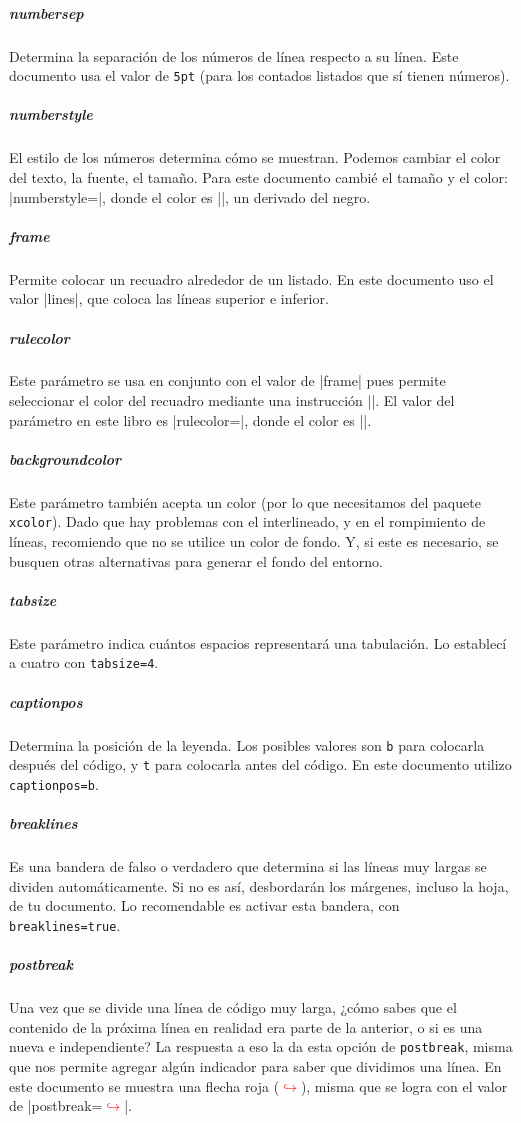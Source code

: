 \subparagraph{numbersep} Determina la separación de los números de línea respecto a su línea. Este documento usa el valor de \texttt{5pt} (para los contados listados que sí tienen números).

\subparagraph{numberstyle} El estilo de los números determina cómo se muestran. Podemos cambiar el color del texto, la fuente, el tamaño. Para este documento cambié el tamaño y el color: |numberstyle=\tiny\color{codigo_numero_linea}|, donde el color es  ||, un derivado del negro.

\subparagraph{frame} Permite colocar un recuadro alrededor de un listado. En este documento uso el valor |lines|, que coloca las líneas superior e inferior.

\subparagraph{rulecolor} Este parámetro se usa en conjunto con el valor de |frame| pues permite seleccionar el color del recuadro mediante una instrucción |\color|. El valor del parámetro en este libro es |rulecolor=\color{codigo_linea_margen}|, donde el color es ||.

\subparagraph{backgroundcolor} Este parámetro también acepta un color (por lo que necesitamos del paquete \texttt{xcolor}). Dado que hay problemas con el interlineado, y en el rompimiento de líneas, recomiendo que no se utilice un color de fondo. Y, si este es necesario, se busquen otras alternativas para generar el fondo del entorno.

\subparagraph{tabsize} Este parámetro indica cuántos espacios representará una tabulación. Lo establecí a cuatro con \texttt{tabsize=4}.

\subparagraph{captionpos} Determina la posición de la leyenda. Los posibles valores son \texttt{b} para colocarla después del código, y \texttt{t} para colocarla antes del código. En este documento utilizo \texttt{captionpos=b}.

\subparagraph{breaklines} Es una bandera de falso o verdadero que determina si las líneas muy largas se dividen automáticamente. Si no es así, desbordarán los márgenes, incluso la hoja, de tu documento. Lo recomendable es activar esta bandera, con \texttt{breaklines=true}.

\subparagraph{postbreak} Una vez que se divide una línea de código muy larga, ¿cómo sabes que el contenido de la próxima línea en realidad era parte de la anterior, o si es una nueva e independiente? La respuesta a eso la da esta opción de \texttt{postbreak}, misma que nos permite agregar algún indicador para saber que dividimos una línea. En este documento se muestra una flecha roja (\textcolor{red}{$\hookrightarrow$}), misma que se logra con el valor de |postbreak=\mbox{\textcolor{red}{$\hookrightarrow$}\space}|.

